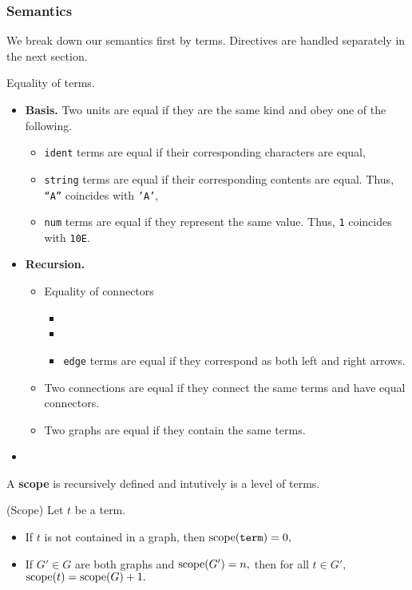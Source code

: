 \subsubsection*{Semantics}
We break down our semantics first by terms. Directives are handled separately in the next section.
\begin{definition}
Equality of terms.
\begin{itemize}
  \item \textbf{Basis.} Two units are equal if they are the same kind and obey one of the following.
	\begin{itemize}
	  \item \texttt{ident} terms are equal if their corresponding characters are equal,
      \item \texttt{string} terms are equal if their corresponding contents are equal. Thus, \texttt{``A''} coincides with \texttt{'A'},
	  \item \texttt{num} terms are equal if they represent the same value. Thus, \texttt{1} coincides with \texttt{10E}.
	\end{itemize}
  \item \textbf{Recursion.}
		\begin{itemize}
		  \item Equality of connectors
				\begin{itemize}
				  \item
				  \item
				  \item \texttt{edge} terms are equal if they correspond as both left and right arrows.
				\end{itemize}

		  \item Two connections are equal if they connect the same terms and have equal connectors.
		  \item Two graphs are equal if they contain the same terms.
	\end{itemize}

\item
\end{itemize}
\end{definition}
A \textbf{scope} is recursively defined and intutively is a level of terms.
\begin{definition} (Scope)
 Let $t$ be a term.
  \begin{itemize}
	\item If $t$ is not contained in a graph, then $\textrm{scope}(\texttt{term}) = 0,$
	\item If $G' \in G$ are both graphs and $\textrm{scope}(G') = n,$ then for all $t \in G',$ $\textrm{scope}(t) = \textrm{scope}(G) + 1.$
\end{itemize}
\end{definition}
